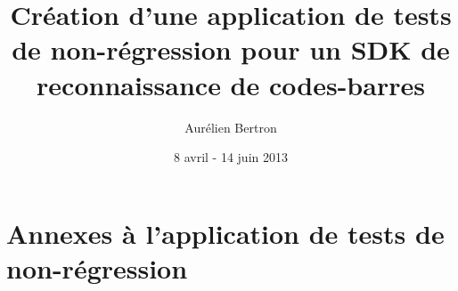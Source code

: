 \documentclass[10pt,a4paper]{report}
\author{Aurélien Bertron}
\date{8 avril - 14 juin 2013}
\title{Création d'une application de tests de non-régression pour un SDK de reconnaissance de codes-barres}
\begin{document}
\maketitle

\thispagestyle{empty}


\tableofcontents
\listoffigures











\appendix
\part*{Annexes à l'application de tests de non-régression}

\end{document}
